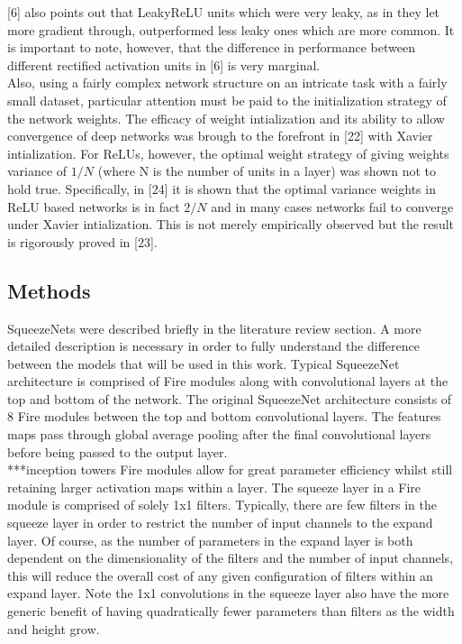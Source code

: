 \documentclass{article}
\begin{document}
[6] also points out that LeakyReLU units which were very leaky, as in they let more gradient through, outperformed less leaky ones which are more common. It is important to note, however, that the difference in performance between different rectified activation units in [6] is very marginal.\\

Also, using a fairly complex network structure on an intricate task with a fairly small dataset, particular attention must be paid to the initialization strategy of the network weights. The efficacy of weight intialization and its ability to allow convergence of deep networks was brough to the forefront in [22] with Xavier intialization. For ReLUs, however, the optimal weight strategy of giving weights variance of $1/N$ (where N is the number of units in a layer) was shown not to hold true. Specifically, in [24] it is shown that the optimal variance weights in ReLU based networks is in fact $2/N$ and in many cases networks fail to converge under Xavier intialization. This is not merely empirically observed but the result is rigorously proved in [23].\\

\subsection*{Methods}
SqueezeNets were described briefly in the literature review section. A more detailed description is necessary in order to fully understand the difference between the models that will be used in this work. Typical SqueezeNet architecture is comprised of Fire modules along with convolutional layers at the top and bottom of the network. The original SqueezeNet architecture consists of 8 Fire modules between the top and bottom convolutional layers. The features maps pass through global average pooling after the final convolutional layers before being passed to the output layer.\\
***inception towers
Fire modules allow for great parameter efficiency whilst still retaining larger activation maps within a layer. The squeeze layer in a Fire module is comprised of solely 1x1 filters. Typically, there are few filters in the squeeze layer in order to restrict the number of input channels to the expand layer. Of course, as the number of parameters in the expand layer is both dependent on the dimensionality of the filters and the number of input channels, this will reduce the overall cost of any given configuration of filters within an expand layer. Note the 1x1 convolutions in the squeeze layer also have the more generic benefit of having quadratically fewer parameters than filters as the width and height grow. \\
\end{document}
